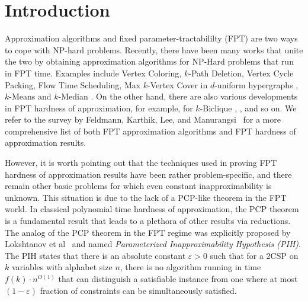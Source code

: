 \section{Introduction}

\noindent Approximation algorithms and fixed parameter-tractabililty (FPT) are two ways to cope with NP-hard problems. Recently, there have been many works that unite the two by obtaining approximation algorithms for NP-Hard problems that run in FPT time. Examples include {\sc Vertex Coloring}\cite{DHK05,Mar08}, {\sc $k$-Path Deletion}\cite{Lee19}, {\sc Vertex Cycle Packing}\cite{Lok+17}, {\sc Flow Time Scheduling}\cite{Wie18}, {\sc Max $k$-Vertex Cover} in $d$-uniform hypergraphs \cite{SF17,Man19}, {\sc $k$-Means} and {\sc $k$-Median} \cite{LiS16,BPR+17,KMN+04,ANSW20,CGTS02,CGK+19}. 
On the other hand, there are also various developments in FPT hardness of approximation, for example, for {\sc $k$-Biclique} \cite{Lin18}, \kclique{} \cite{CCK+17, Lin21, LRSW22, KK22, LRSW23, CFL+23}, \ksetcover{} \cite{CCK+17,CL19,KLM19,Lin19,KN21,LRSW23a} and so on.
We refer to the survey by Feldmann, Karthik, Lee, and Manurangsi~\cite{FKLM20} for a more comprehensive list of both FPT approximation algorithms and FPT hardness of approximation results.

However, it is worth pointing out that the techniques used in proving FPT hardness of approximation results have been rather problem-specific, and there remain other basic problems for which even constant inapproximability is unknown. This situation is due to the lack of a PCP-like theorem in the FPT world. In classical polynomial time hardness of approximation, the PCP theorem is a fundamental result that leads to a plethora of other results via reductions. The analog of the PCP theorem in the FPT regime was explicitly proposed by Lokshtanov et al~\cite{LRSZ20} and named \emph{Parameterized Inapproximability Hypothesis (PIH)}. The PIH states that there is an absolute constant $\varepsilon > 0$ such that for a 2CSP on $k$ variables with alphabet size $n$, there is no algorithm running in time $f(k)\cdot n^{O(1)}$ that can distinguish a satisfiable instance from one where at most $(1-\varepsilon)$ fraction of constraints can be simultaneously satisfied.

